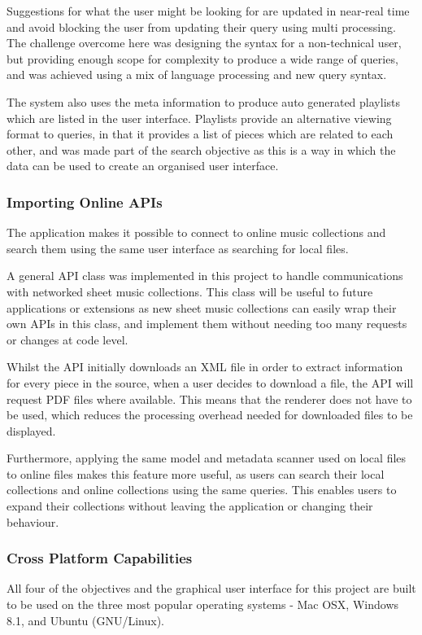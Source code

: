 Suggestions for what the user might be looking for are updated in near-real time and avoid blocking the user from updating their query using multi processing. The challenge overcome here was designing the syntax for a non-technical user, but providing enough scope for complexity to produce a wide range of queries, and was achieved using a mix of language processing and new query syntax.

The system also uses the meta information to produce auto generated playlists which are listed in the user interface. Playlists provide an alternative viewing format to queries, in that it provides a list of pieces which are related to each other, and was made part of the search objective as this is a way in which the data can be used to create an organised user interface. 


\subsubsection{Importing Online APIs}
The application makes it possible to connect to online music collections and search them using the same user interface as searching for local files.

A general API class was implemented in this project to handle communications with networked sheet music collections. This class will be useful to future applications or extensions as new sheet music collections can easily wrap their own APIs in this class, and implement them without needing too many requests or changes at code level.

Whilst the API initially downloads an XML file in order to extract information for every piece in the source, when a user decides to download a file, the API will request PDF files where available. This means that the renderer does not have to be used, which reduces the processing overhead needed for downloaded files to be displayed.

Furthermore, applying the same model and metadata scanner used on local files to online files makes this feature more useful, as users can search their local collections and online collections using the same queries. This enables users to expand their collections without leaving the application or changing their behaviour.

\subsubsection{Cross Platform Capabilities}
All four of the objectives and the graphical user interface for this project are built to be used on the three most popular operating systems - Mac OSX, Windows 8.1, and Ubuntu (GNU/Linux).


